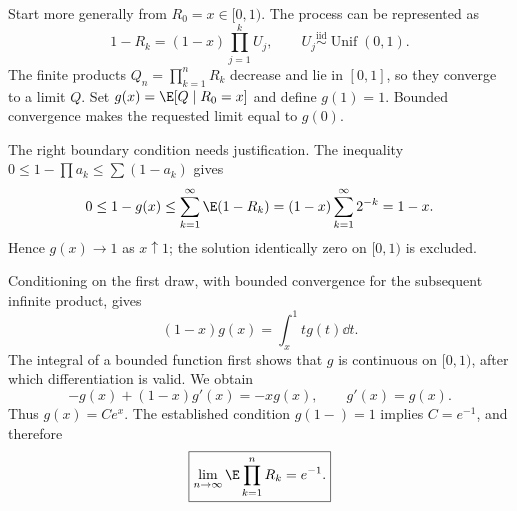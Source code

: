 Start more generally from $R_0=x\in[0,1)$. The process can be represented as
\[
1-R_k=(1-x)\prod_{j=1}^kU_j,
\qquad U_j\overset{\mathrm{iid}}\sim\operatorname{Unif}(0,1).
\]
The finite products $Q_n=\prod_{k=1}^nR_k$ decrease and lie in $[0,1]$, so they converge to a limit $Q$. Set $g(x)=\E[Q\mid R_0=x]$ and define $g(1)=1$. Bounded convergence makes the requested limit equal to $g(0)$.

The right boundary condition needs justification. The inequality $0\le1-\prod a_k\le\sum(1-a_k)$ gives
\[
0\le1-g(x)\le\sum_{k=1}^{\infty}\E(1-R_k)
=(1-x)\sum_{k=1}^{\infty}2^{-k}=1-x.
\]
Hence $g(x)\to1$ as $x\uparrow1$; the solution identically zero on $[0,1)$ is excluded.

Conditioning on the first draw, with bounded convergence for the subsequent infinite product, gives
\[
(1-x)g(x)=\int_x^1t g(t)\dd t.
\]
The integral of a bounded function first shows that $g$ is continuous on $[0,1)$, after which differentiation is valid. We obtain
\[
-g(x)+(1-x)g'(x)=-xg(x),\qquad g'(x)=g(x).
\]
Thus $g(x)=Ce^x$. The established condition $g(1-)=1$ implies $C=e^{-1}$, and therefore
\[
\boxed{\lim_{n\to\infty}\E\prod_{k=1}^nR_k=e^{-1}.}
\]
